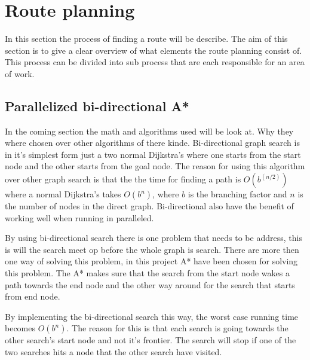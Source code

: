 \section{Route planning}
In this section the process of finding a route will be describe.
The aim of this section is to give a clear overview of what elements the route planning consist of.
This process can be divided into sub process that are each responsible for an area of work.

\subsection{Parallelized bi-directional A*} \label{algorithms}

In the coming section the math and algorithms used will be look at. Why they where chosen over other algorithms of there kinde.
Bi-directional graph search is in it's simplest form just a two normal Dijkstra’s where one starts from the start node and the other starts from the goal node.
The reason for using this algorithm over other graph search is that the the time for finding a path is $O(b^{(n/2)})$ where a normal Dijkstra’s takes $O(b^{n})$, where $b$ is the branching factor and $n$ is the number of nodes in the direct graph. Bi-directional also have the benefit of working well when running in paralleled.


By using bi-directional search there is one problem that needs to be address, this is will the search meet op before the whole graph is search. There are more then one way of solving this problem, in this project A* have been chosen for solving this problem. The A* makes sure that the search from the start node wakes a path towards the end node and the other way around for the search that starts from end node.

By implementing the bi-directional search this way, the worst case running time becomes $O(b^{n})$. The reason for this is that each search is going towards the other search's start node and not it's frontier. The search will stop if one of the two searches hits a node that the other search have visited.




